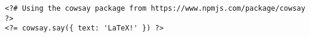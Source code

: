 \documentclass{article}
\begin{document}
\begin{verbatim}
<?# Using the cowsay package from https://www.npmjs.com/package/cowsay ?>
<?= cowsay.say({ text: 'LaTeX!' }) ?>
\end{verbatim}
\end{document}
